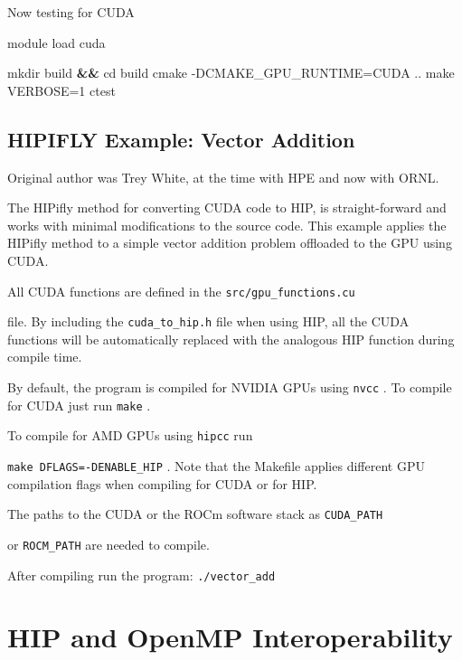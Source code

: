 \documentclass[
]{article}
\let\oldtexttt\texttt
\renewcommand{\texttt}[1]{
  \colorbox{Light}{\oldtexttt{#1}}
}
\newenvironment{Shaded}{}{}
\newcommand{\BuiltInTok}[1]{#1}
\newcommand{\ExtensionTok}[1]{#1}
\newcommand{\FunctionTok}[1]{\textcolor[rgb]{0.02,0.16,0.49}{#1}}
\newcommand{\KeywordTok}[1]{\textcolor[rgb]{0.00,0.44,0.13}{\textbf{#1}}}
\newcommand{\NormalTok}[1]{#1}
\begin{document}
Now testing for CUDA

\begin{Shaded}
\begin{Highlighting}[]
\ExtensionTok{module}\NormalTok{ load cuda}

\FunctionTok{mkdir}\NormalTok{ build }\KeywordTok{\&\&} \BuiltInTok{cd}\NormalTok{ build}
\FunctionTok{cmake}\NormalTok{ {-}DCMAKE\_GPU\_RUNTIME=CUDA ..}
\FunctionTok{make}\NormalTok{ VERBOSE=1}
\ExtensionTok{ctest}
\end{Highlighting}
\end{Shaded}

\hypertarget{hipifly-example-vector-addition}{%
\subsection{HIPIFLY Example: Vector
Addition}\label{hipifly-example-vector-addition}}

Original author was Trey White, at the time with HPE and now with ORNL.

The HIPifly method for converting CUDA code to HIP, is straight-forward
and works with minimal modifications to the source code. This example
applies the HIPifly method to a simple vector addition problem offloaded
to the GPU using CUDA.

All CUDA functions are defined in the \texttt{src/gpu\_functions.cu}
file. By including the \texttt{cuda\_to\_hip.h} file when using HIP, all
the CUDA functions will be automatically replaced with the analogous HIP
function during compile time.

By default, the program is compiled for NVIDIA GPUs using \texttt{nvcc}.
To compile for CUDA just run \texttt{make}.

To compile for AMD GPUs using \texttt{hipcc} run
\texttt{make\ DFLAGS=-DENABLE\_HIP}. Note that the Makefile applies
different GPU compilation flags when compiling for CUDA or for HIP.

The paths to the CUDA or the ROCm software stack as \texttt{CUDA\_PATH}
or \texttt{ROCM\_PATH} are needed to compile.

After compiling run the program: \texttt{./vector\_add}

\pagebreak

\hypertarget{hip-and-openmp-interoperability}{%
\section{HIP and OpenMP
Interoperability}\label{hip-and-openmp-interoperability}}
\end{document}
